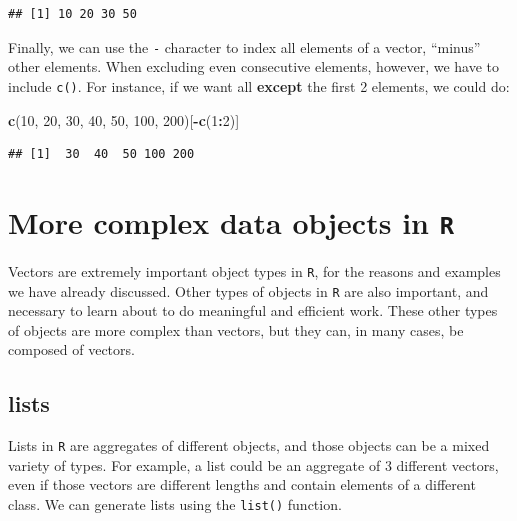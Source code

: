 \documentclass[]{book}
\newenvironment{Shaded}{\begin{snugshade}}{\end{snugshade}}
\newcommand{\DecValTok}[1]{\textcolor[rgb]{0.00,0.00,0.81}{#1}}
\newcommand{\KeywordTok}[1]{\textcolor[rgb]{0.13,0.29,0.53}{\textbf{#1}}}
\newcommand{\NormalTok}[1]{#1}
\newcommand{\OperatorTok}[1]{\textcolor[rgb]{0.81,0.36,0.00}{\textbf{#1}}}
\begin{document}
\begin{verbatim}
## [1] 10 20 30 50
\end{verbatim}

Finally, we can use the \texttt{-} character to index all elements of a vector, ``minus'' other elements. When excluding even consecutive elements, however, we have to include \texttt{c()}. For instance, if we want all \textbf{except} the first 2 elements, we could do:

\begin{Shaded}
\begin{Highlighting}[]
\KeywordTok{c}\NormalTok{(}\DecValTok{10}\NormalTok{, }\DecValTok{20}\NormalTok{, }\DecValTok{30}\NormalTok{, }\DecValTok{40}\NormalTok{, }\DecValTok{50}\NormalTok{, }\DecValTok{100}\NormalTok{, }\DecValTok{200}\NormalTok{)[}\OperatorTok{-}\KeywordTok{c}\NormalTok{(}\DecValTok{1}\OperatorTok{:}\DecValTok{2}\NormalTok{)]}
\end{Highlighting}
\end{Shaded}

\begin{verbatim}
## [1]  30  40  50 100 200
\end{verbatim}

\hypertarget{more-complex-data-objects-in-r}{%
\section{\texorpdfstring{More complex data objects in \texttt{R}}{More complex data objects in R}}\label{more-complex-data-objects-in-r}}

Vectors are extremely important object types in \texttt{R}, for the reasons and examples we have already discussed. Other types of objects in \texttt{R} are also important, and necessary to learn about to do meaningful and efficient work. These other types of objects are more complex than vectors, but they can, in many cases, be composed of vectors.

\hypertarget{lists}{%
\subsection{lists}\label{lists}}

Lists in \texttt{R} are aggregates of different objects, and those objects can be a mixed variety of types. For example, a list could be an aggregate of 3 different vectors, even if those vectors are different lengths and contain elements of a different class. We can generate lists using the \texttt{list()} function.
\end{document}
